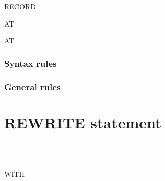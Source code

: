 \begin{syntax}
   \filename RECORD
  \begin{0-1}
     \identifier
  \end{0-1}

  AT  \imperativestatement

  \begin{0-1}
     AT  \imperativestatement
  \end{0-1}

  \begin{0-1}
  \end{0-1}
\end{syntax}

\subsubsection{Syntax rules}

\subsubsection{General rules}

\section{REWRITE statement}

\begin{syntax}
  \recordname
  \begin{0-1}
    \begin{1=}
      \identifier \\
      \literal \\
      \functionname
    \end{1=}
  \end{0-1}
  \begin{0-1}
  \end{0-1}
  \begin{0-1}
    WITH
    \begin{0-1}
    \end{0-1}
  \end{0-1}

  \begin{0+}
      \imperativestatement \\
       \imperativestatement
  \end{0+} \\

  \begin{0-1}
  \end{0-1}
\end{syntax}

